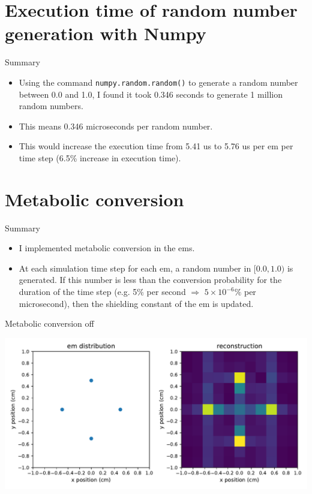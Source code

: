 \documentclass[dvipsnames]{beamer}
\begin{document}
\section{Execution time of random number generation with Numpy}

\begin{frame}{Summary}
\begin{itemize}
\item Using the command \texttt{numpy.random.random()} to generate a random number between 0.0 and 1.0, I found it took 0.346 seconds to generate 1 million random numbers.
\item This means 0.346 microseconds per random number.
\item This would increase the execution time from 5.41 us to 5.76 us per em per time step (6.5\% increase in execution time).
\end{itemize}
\end{frame}

\section{Metabolic conversion}

\begin{frame}{Summary}
\begin{itemize}
\item I implemented metabolic conversion in the ems.
\item At each simulation time step for each em, a random number in $[0.0,1.0)$ is generated. If this number is less than the conversion probability for the duration of the time step (e.g. 5\% per second $\Rightarrow$ $5 \times 10^{-6}\%$ per microsecond), then the shielding constant of the em is updated.
\end{itemize}
\end{frame}

\begin{frame}{Metabolic conversion off}
\begin{center}
\includegraphics[width=\textwidth]{reconstruction_metabolism-off}
\end{center}
\end{frame}
\end{document}
